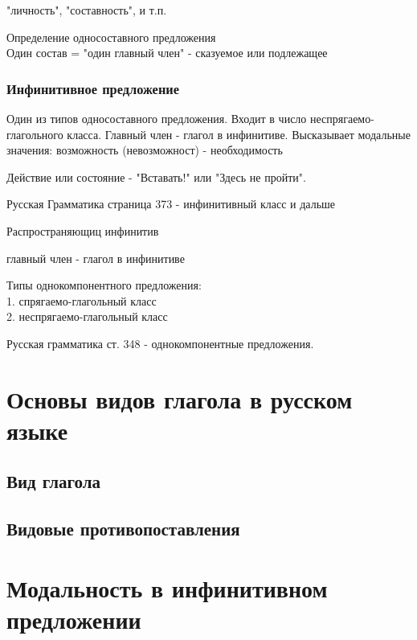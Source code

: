 \documentclass{article}
\begin{document}
"личность", "составность", и т.п.


Определение односоставного предложения  \\

Один состав = "один главный член" -  сказуемое или подлежащее

\subsubsection{Инфинитивное предложение}

Один из типов односоставного предложения. Входит в число неспрягаемо-глагольного класса. Главный член - глагол в инфинитиве. Высказывает модальные значения: возможность (невозможност) - необходимость 

Действие или состояние - "Вставать!" или "Здесь не пройти".

Русская Грамматика страница 373 - инфинитивный класс и дальше

Распространяющиц инфинитив

главный член - глагол в инфинитиве

Типы однокомпонентного предложения: \\ 
	1. спрягаемо-глагольный класс \\
	2. неспрягаемо-глагольный класс

Русская грамматика ст. 348 - однокомпонентные предложения.

\section{Основы видов глагола в русском языке}

\subsection{Вид глагола}

\subsection{Видовые противопоставления}

\section{Модальность в инфинитивном предложении}
\end{document}
